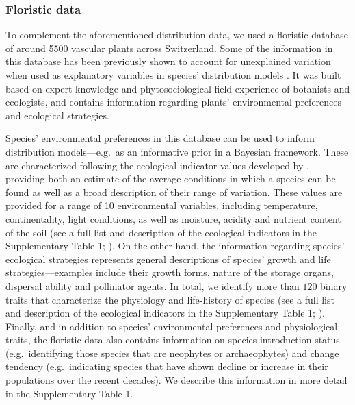 \documentclass[11pt, a4paper]{article}
\begin{document}
\subsubsection*{Floristic data}
To complement the aforementioned distribution data, we used a floristic database of around 5500 vascular plants across Switzerland. Some of the information in this database has been previously shown to account for unexplained variation when used as explanatory variables in species' distribution models \citep{scherrerEcologicalIndicatorValues2019}.  It was built based on expert knowledge and phytosociological field experience of botanists and ecologists, and contains information regarding plants' environmental preferences and ecological strategies. 

Species' environmental preferences in this database can be used to inform distribution models---e.g.~as an informative prior in a Bayesian framework. These are characterized following the ecological indicator values developed by \citet{landoltFloraIndicativaOkologische2010}, providing both an estimate of the average conditions in which a species can be found as well as a broad description of their range of variation. These values are provided for a range of 10 environmental variables, including temperature, continentality, light conditions, as well as moisture, acidity and nutrient content of the soil (see a full list and description of the ecological indicators in the Supplementary Table 1; \citealt{landoltFloraIndicativaOkologische2010}). On the other hand, the information regarding species' ecological strategies represents general descriptions of species' growth and life strategies---examples include their growth forms, nature of the storage organs, dispersal ability and pollinator agents. In total, we identify more than $120$ binary traits that characterize the physiology and life-history of species (see a full list and description of the ecological indicators in the Supplementary Table 1; \citealt{landoltFloraIndicativaOkologische2010}). Finally, and in addition to species' environmental preferences and physiological traits, the floristic data also contains information on species introduction status (e.g.~identifying those species that are neophytes or archaeophytes) and change tendency (e.g.~indicating species that have shown decline or increase in their populations over the recent decades). We describe this information in more detail in the Supplementary Table 1.

\end{document}
